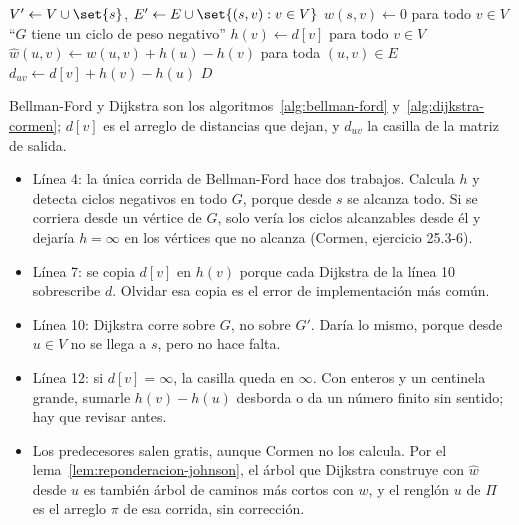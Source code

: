\documentclass[11pt,letterpaper]{article}
\begin{document}
\begin{algorithm}[H]
\caption{\textsc{Johnson}$(G, w)$}
\label{alg:johnson}
\begin{algorithmic}[1]
  \State $V' \gets V \cup \set{s}$, \quad
         $E' \gets E \cup \set{(s, v) : v \in V}$
  \State $w(s, v) \gets 0$ para todo $v \in V$
    \State \Return ``$G$ tiene un ciclo de peso negativo''
  \EndIf
  \State $h(v) \gets d[v]$ para todo $v \in V$
  \State $\hat{w}(u, v) \gets w(u, v) + h(u) - h(v)$ para toda
         $(u, v) \in E$ 
    \State {}
      \State $d_{uv} \gets d[v] + h(v) - h(u)$
    \EndFor
  \EndFor
  \State \Return $D$
\EndProcedure
\end{algorithmic}
\end{algorithm}

Bellman-Ford y Dijkstra son los algoritmos~\ref{alg:bellman-ford}
y~\ref{alg:dijkstra-cormen}; $d[v]$ es el arreglo de distancias que
dejan, y $d_{uv}$ la casilla de la matriz de salida.
\begin{itemize}[itemsep=0.1em]
  \item Línea 4: la única corrida de Bellman-Ford hace dos trabajos.
        Calcula $h$ y detecta ciclos negativos en todo $G$, porque
        desde $s$ se alcanza todo. Si se corriera desde un vértice de
        $G$, solo vería los ciclos alcanzables desde él y dejaría
        $h = \infty$ en los vértices que no alcanza
        (Cormen, ejercicio 25.3-6).
  \item Línea 7: se copia $d[v]$ en $h(v)$ porque cada Dijkstra de la
        línea 10 sobrescribe $d$. Olvidar esa copia es el error de
        implementación más común.
  \item Línea 10: Dijkstra corre sobre $G$, no sobre $G'$. Daría lo
        mismo, porque desde $u \in V$ no se llega a $s$, pero no hace
        falta.
  \item Línea 12: si $d[v] = \infty$, la casilla queda en $\infty$. Con
        enteros y un centinela grande, sumarle $h(v) - h(u)$ desborda o
        da un número finito sin sentido; hay que revisar antes.
  \item Los predecesores salen gratis, aunque Cormen no los calcula.
        Por el lema~\ref{lem:reponderacion-johnson}, el árbol que
        Dijkstra construye con $\hat{w}$ desde $u$ es también árbol de
        caminos más cortos con $w$, y el renglón $u$ de $\Pi$ es el
        arreglo $\pi$ de esa corrida, sin corrección.
\end{itemize}
\end{document}
